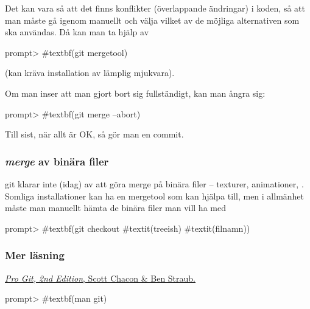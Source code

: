 \documentclass[swedish]{beamer}
\begin{document}
\begin{frame}[fragile]
    Det kan vara så att det finns konflikter (överlappande ändringar) i koden, så att man måste gå igenom manuellt och välja vilket av de möjliga alternativen som ska användas.  Då kan man ta hjälp av 
\begin{dialogue}
prompt> #textbf(git mergetool)
\end{dialogue}
(kan kräva installation av lämplig mjukvara).

Om man inser att man gjort bort sig fullständigt, kan man ångra sig:
\begin{dialogue}
prompt> #textbf(git merge --abort)
\end{dialogue}

Till sist, när allt är OK, så gör man en commit.
\end{frame}
\begin{frame}[fragile]
\frametitle{\emph{merge} av binära filer}
git klarar inte (idag) av att göra merge på binära filer -- \mao texturer, animationer, \odyl.  Somliga installationer kan ha en mergetool som kan hjälpa till, men i allmänhet måste man manuellt hämta de binära filer man vill ha med 
\begin{dialogue}
prompt> #textbf(git checkout #textit(treeish) #textit(filnamn))  
\end{dialogue}
  
\end{frame}


\begin{frame}[fragile]
\frametitle{Mer läsning}  
\href{http://git-scm.com/book/en/v2/}{\textsl{Pro Git, 2nd Edition}, Scott Chacon \& Ben Straub.}
\begin{dialogue}
prompt> #textbf(man git)
\end{dialogue}
\end{frame}
\end{document}
